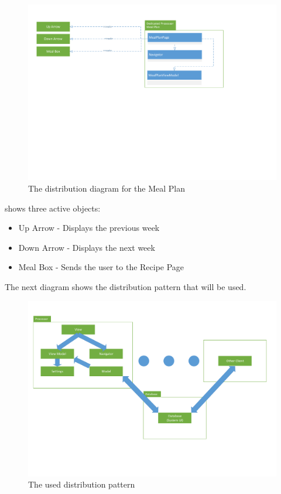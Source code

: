 \begin{figure}[H]
\includegraphics[width=\linewidth, clip=true, trim=0.5cm 10cm 6cm 1.5cm]{Grafik/FoodPlanner/DistributionMealPlan}
\centering
\caption{The distribution diagram for the Meal Plan}
\label{MPD}
\end{figure}

 shows three active objects:
\begin{itemize}
\item Up Arrow 
- Displays the previous week
\item Down Arrow 
- Displays the next week
\item Meal Box 
- Sends the user to the Recipe Page
\end{itemize}

The next diagram shows the distribution pattern that will be used.

\begin{figure}[H]
\includegraphics[width=\linewidth, clip=true, trim=0cm 4cm 0.5cm 1cm]{Grafik/FoodPlanner/FordelingsDiagram}
\centering
\caption{The used distribution pattern}
\label{DP}
\end{figure}

